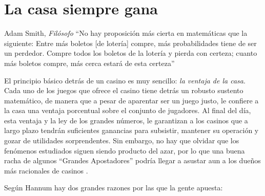  \section{La casa siempre gana}



\begin{chapquote}{Adam Smith, \textit{Filósofo} \cite{smith1963wealth}}
	``No hay proposición más cierta en matemáticas que la siguiente: Entre más boletos [de lotería] compre, más probabilidades tiene de ser un perdedor. Compre todos los boletos de la lotería y pierda con certeza; cuanto más boletos compre, más cerca estará de esta certeza''
\end{chapquote}



El principio básico detrás de un casino es muy sencillo: \emph{la ventaja de la casa}. Cada uno de los juegos que ofrece el casino tiene detrás un robusto sustento matemático, de manera que a pesar de aparentar ser un juego justo, le confiere a la casa una ventaja porcentual sobre el conjunto de jugadores. Al final del día, esta ventaja y la ley de los grandes números, le garantizan a los casinos que a largo plazo tendrán suficientes ganancias para subsistir, mantener su operación y gozar de utilidades sorprendentes. Sin embargo, no hay que olvidar que los fenómenos estudiados siguen siendo producto del azar, por lo que una buena racha de algunos ``Grandes Apostadores'' podría llegar a asustar aun a los dueños  más racionales de casinos \cite{hannum2005practical}.



Según Hannum \cite{hannum2005practical} hay dos grandes razones por las que la gente apuesta:

